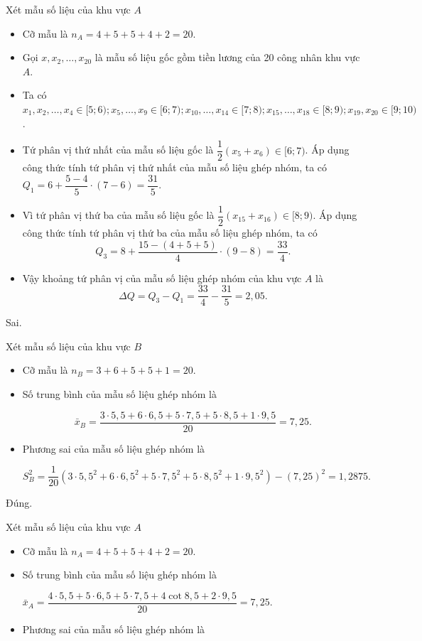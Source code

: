 \begin{ex}
{\begin{itemchoice}
			 Xét mẫu số liệu của khu vực $A$
			 \begin{itemize}
			 	\item 	Cỡ mẫu là $n_A=4+5+5+4+2=20$.
			 	\item 	Gọi $x, x_2, \ldots, x_{20}$ là mẫu số liệu gốc gồm tiền lương của 20 công nhân khu vực $A$.
			 	\item 	Ta có $x_1, x_2, \ldots, x_4 \in[5; 6); x_5, \ldots, x_9 \in[6; 7); x_{10}, \ldots, x_{14} \in[7; 8); x_{15}, \ldots, x_{18} \in[8; 9); x_{19}, x_{20} \in[9; 10)$.
			 	\item 	
			 Tứ phân vị thứ nhất của mẫu số liệu gốc là $\dfrac{1}{2}\left(x_5+x_6\right) \in[6; 7)$. 	Áp dụng công thức tính tứ phân vị thứ nhất của mẫu số liệu ghép nhóm, ta có $Q_1=6+\dfrac{5-4}{5} \cdot(7-6)=\dfrac{31}{5}$.
			 \item 	Vì tứ phân vị thứ ba của mẫu số liệu gốc là $\dfrac{1}{2}\left(x_{15}+x_{16}\right) \in[8; 9)$. Áp dụng công thức tính tứ phân vị thứ ba của mẫu số liệu ghép nhóm, ta có
			 		 $$
			 Q_3=8+\dfrac{15-(4+5+5)}{4} \cdot(9-8)=\dfrac{33}{4}.
			 $$	
			 \item 	Vậy khoảng tứ phân vị của mẫu số liệu ghép nhóm của khu vực $A$ là $$\Delta Q=Q_3-Q_1=\dfrac{33}{4}-\dfrac{31}{5}=2{,}05.$$
			 \end{itemize}
		
\itemch Sai.
	
		 Xét mẫu số liệu của khu vực $B$
	\begin{itemize}
		\item Cỡ mẫu là $n_B=3+6+5+5+1=20$.
		\item 	Số trung bình của mẫu số liệu ghép nhóm là
		
		$$
		\bar{x}_B=\dfrac{3\cdot 5{,}5+6\cdot 6{,}5+5\cdot 7{,}5+5\cdot 8{,}5+1\cdot 9{,}5}{20}=7{,}25.
		$$
		\item Phương sai của mẫu số liệu ghép nhóm là
		
		$S_B^2=\dfrac{1}{20}\left(3\cdot 5{,}5^2+6\cdot 6{,}5^2+5\cdot 7{,}5^2+5\cdot 8{,}5^2+1\cdot 9{,}5^2\right)-(7{,}25)^2=1{,}2875.$
	\end{itemize}	
\itemch Đúng.		
	
	 Xét mẫu số liệu của khu vực $A $
	\begin{itemize}
		\item 	Cỡ mẫu là $n_A=4+5+5+4+2=20$.
		\item 	Số trung bình của mẫu số liệu ghép nhóm là
		
		$\bar{x}_A=\dfrac{4\cdot 5{,}5+5\cdot 6{,}5+5\cdot 7{,}5+4\cot 8{,}5+2\cdot 9{,}5}{20}=7{,}25$.
		\item 	Phương sai của mẫu số liệu ghép nhóm là
		

\end{itemize}
\end{itemchoice}}
\end{ex}
